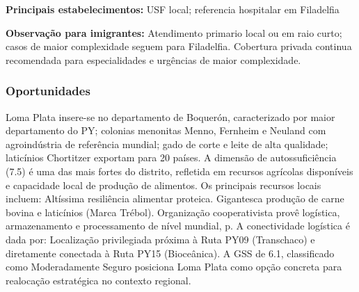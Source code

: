 \textbf{Principais estabelecimentos:} USF local; referencia hospitalar
em Filadelfia

\textbf{Observação para imigrantes:} Atendimento primario local ou em
raio curto; casos de maior complexidade seguem para Filadelfia.
Cobertura privada continua recomendada para especialidades e urgências
de maior complexidade.
\newpage

\subsubsection*{Oportunidades}\label{oport-loma-plata-1605}
Loma Plata insere-se no departamento de Boquerón, caracterizado por maior departamento do PY; colonias menonitas Menno, Fernheim e Neuland com agroindústria de referência mundial; gado de corte e leite de alta qualidade; laticínios Chortitzer exportam para 20 países. A dimensão de autossuficiência (7.5) é uma das mais fortes do distrito, refletida em recursos agrícolas disponíveis e capacidade local de produção de alimentos. Os principais recursos locais incluem: Altíssima resiliência alimentar proteica. Gigantesca produção de carne bovina e laticínios (Marca Trébol). Organização cooperativista provê logística, armazenamento e processamento de nível mundial, p. A conectividade logística é dada por: Localização privilegiada próxima à Ruta PY09 (Transchaco) e diretamente conectada à Ruta PY15 (Bioceânica). A GSS de 6.1, classificado como Moderadamente Seguro posiciona Loma Plata como opção concreta para realocação estratégica no contexto regional.

